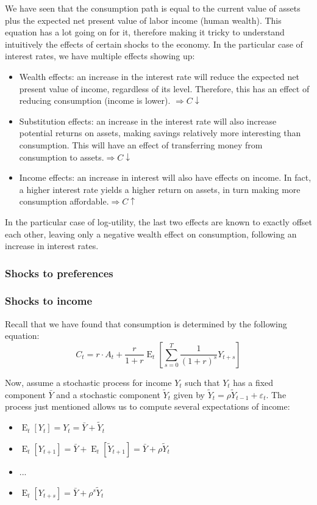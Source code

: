 \documentclass[12pt]{report}
\newcommand{\Et}[1]{\operatorname{E}_t\left[#1\right]}
\begin{document}
We have seen that the consumption path is equal to the current value of assets plus the expected net present value of labor income (human wealth). This equation has a lot going on for it, therefore making it tricky to understand intuitively the effects of certain shocks to the economy. In the particular case of interest rates, we have multiple effects showing up:\begin{itemize}
\item Wealth effects: an increase in the interest rate will reduce the expected net present value of income, regardless of its level. Therefore, this has an effect of reducing consumption (income is lower). $\Rightarrow C\downarrow$
\item Substitution effects: an increase in the interest rate will also increase potential returns on assets, making savings relatively more interesting than consumption. This will have an effect of transferring money from consumption to assets.$\Rightarrow C\downarrow$
\item Income effects: an increase in interest will also have effects on income. In fact, a higher interest rate yields a higher return on assets, in turn making more consumption affordable.$\Rightarrow C\uparrow$
\end{itemize} In the particular case of log-utility, the last two effects are known to exactly offset each other, leaving only a negative wealth effect on consumption, following an increase in interest rates.

\subsubsection{Shocks to preferences}



\subsubsection{Shocks to income}

Recall that we have found that consumption is determined by the following equation: $$ C_{t} = r \cdot A_t + \frac{r}{1+r} \Et{\sum_{s=0}^{T} \frac{1}{(1+r)^{s}}Y_{t+s}} $$

Now, assume a stochastic process for income $Y_t$ such that $Y_t$ has a fixed component $\bar Y$ and a stochastic component $\tilde Y_t$ given by $\tilde Y_t = \rho \tilde Y_{t-1} + \varepsilon_t $. The process just mentioned allows us to compute several expectations of income:\begin{itemize}
\item $\Et{Y_t} = Y_t = \bar Y + \tilde Y_t $
\item $\Et{Y_{t+1}} = \bar Y + \Et{\tilde Y_{t+1}} = \bar Y + \rho \tilde Y_t$
\item ...
\item $\Et{Y_{t+s}} = \bar Y + \rho^s \tilde Y_t$
\end{itemize}
\end{document}
